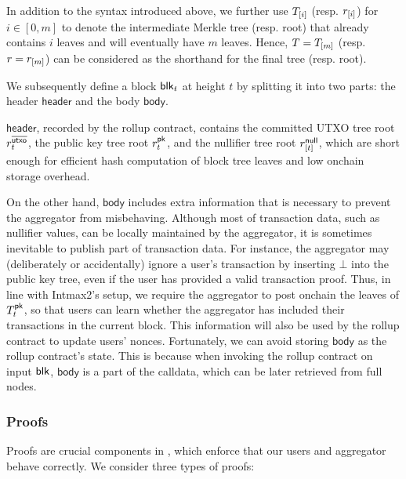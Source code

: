 In addition to the syntax introduced above, we further use $T_{[i]}$ (resp. $r_{[i]}$) for $i \in [0, m]$ to denote the intermediate Merkle tree (resp. root) that already contains $i$ leaves and will eventually have $m$ leaves.
Hence, $T = T_{[m]}$ (resp. $r = r_{[m]}$) can be considered as the shorthand for the final tree (resp. root).

We subsequently define a block $\mathsf{blk}_t$ at height $t$ by splitting it into two parts: the header $\mathsf{header}$ and the body $\mathsf{body}$.

$\mathsf{header}$, recorded by the rollup contract, contains the committed \ac{UTXO} tree root $r^{\overline{\mathsf{utxo}}}_t$,
the public key tree root $r^{\mathsf{pk}}_t$,
and the nullifier tree root $r^\mathsf{null}_{[t]}$,
which are short enough for efficient hash computation of block tree leaves and low onchain storage overhead.

On the other hand, $\mathsf{body}$ includes extra information that is necessary to prevent the aggregator from misbehaving.
Although most of transaction data, such as nullifier values, can be locally maintained by the aggregator, it is sometimes inevitable to publish part of transaction data.
For instance, the aggregator may (deliberately or accidentally) ignore a user's transaction by inserting $\bot$ into the public key tree, even if the user has provided a valid transaction proof.
Thus, in line with Intmax2's setup, we require the aggregator to post onchain the leaves of $T^{\mathsf{pk}}_t$, so that users can learn whether the aggregator has included their transactions in the current block.
This information will also be used by the rollup contract to update users' nonces.
Fortunately, we can avoid storing $\mathsf{body}$ as the rollup contract's state.
This is because when invoking the rollup contract on input $\mathsf{blk}$, $\mathsf{body}$ is a part of the calldata, which can be later retrieved from full nodes.


\subsubsection{Proofs}

Proofs are crucial components in \Protocol, which enforce that our users and aggregator behave correctly.
We consider three types of proofs:

